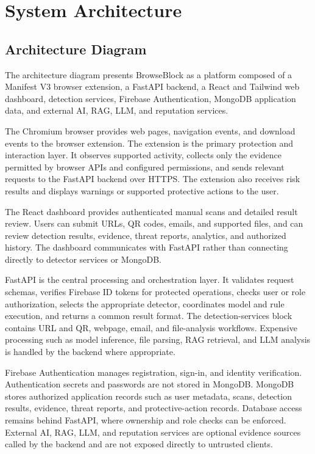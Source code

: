 \chapter{System Architecture}
\setcounter{equation}{0}
\sloppy

\section{Architecture Diagram}
The architecture diagram presents BrowseBlock as a platform composed of a Manifest
V3 browser extension, a FastAPI backend, a React and Tailwind web dashboard,
detection services, Firebase Authentication, MongoDB application data, and
external AI, RAG, LLM, and reputation services.

The Chromium browser provides web pages, navigation events, and download events
to the browser extension. The extension is the primary protection and interaction
layer. It observes supported activity, collects only the evidence permitted by
browser APIs and configured permissions, and sends relevant requests to the
FastAPI backend over HTTPS. The extension also receives risk results and displays
warnings or supported protective actions to the user.

The React dashboard provides authenticated manual scans and detailed result
review. Users can submit URLs, QR codes, emails, and supported files, and can
review detection results, evidence, threat reports, analytics, and authorized
history. The dashboard communicates with FastAPI rather than connecting directly
to detector services or MongoDB.

FastAPI is the central processing and orchestration layer. It validates request
schemas, verifies Firebase ID tokens for protected operations, checks user or
role authorization, selects the appropriate detector, coordinates model and rule
execution, and returns a common result format. The detection-services block
contains URL and QR, webpage, email, and file-analysis workflows. Expensive
processing such as model inference, file parsing, RAG retrieval, and LLM analysis
is handled by the backend where appropriate.

Firebase Authentication manages registration, sign-in, and identity verification.
Authentication secrets and passwords are not stored in MongoDB. MongoDB stores
authorized application records such as user metadata, scans, detection results,
evidence, threat reports, and protective-action records. Database access remains
behind FastAPI, where ownership and role checks can be enforced. External AI,
RAG, LLM, and reputation services are optional evidence sources called by the
backend and are not exposed directly to untrusted clients.

